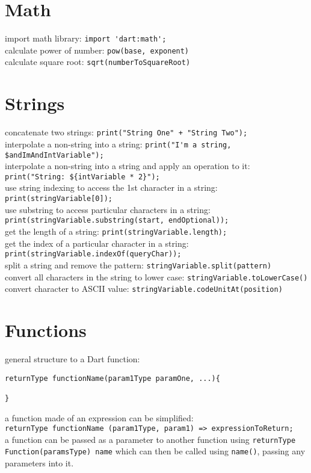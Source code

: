 \documentclass[a4paper,11pt]{article}
\begin{document}
\section{Math}
import math library: \verb|import 'dart:math';|\\
calculate power of number: \verb|pow(base, exponent)|\\
calculate square root: \verb|sqrt(numberToSquareRoot)|

\section{Strings}
concatenate two strings: \verb|print("String One" + "String Two");|\\
interpolate a non-string into a string: \verb|print("I'm a string, $andImAndIntVariable");|\\
interpolate a non-string into a string and apply an operation to it: \verb|print("String: ${intVariable * 2}");|\\
use string indexing to access the 1st character in a string: \verb|print(stringVariable[0]);|\\
use substring to access particular characters in a string:\\ \verb|print(stringVariable.substring(start, endOptional));|\\
get the length of a string: \verb|print(stringVariable.length);|\\
get the index of a particular character in a string: \verb|print(stringVariable.indexOf(queryChar));|\\
split a string and remove the pattern: \verb|stringVariable.split(pattern)|\\
convert all characters in the string to lower case: \verb|stringVariable.toLowerCase()|\\
convert character to ASCII value: \verb|stringVariable.codeUnitAt(position)|

\section{Functions}
general structure to a Dart function:
\begin{verbatim}
returnType functionName(param1Type paramOne, ...){
    
}
\end{verbatim}
a function made of an expression can be simplified:\\
\verb|returnType functionName (param1Type, param1) => expressionToReturn;|\\
a function can be passed as a parameter to another function using \verb|returnType Function(paramsType) name| which can then be called using \verb|name()|, passing any parameters into it.
\end{document}
